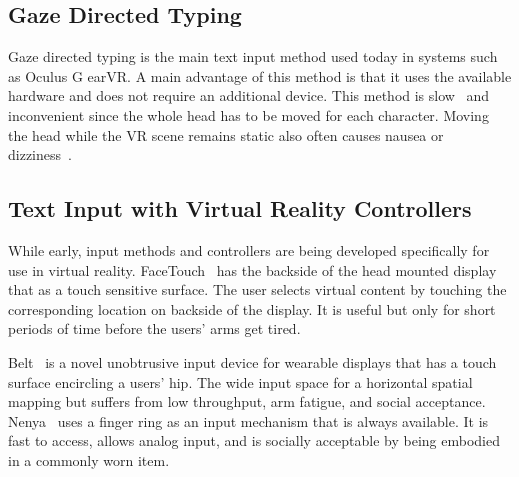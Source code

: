 \subsection{Gaze Directed Typing}
Gaze directed typing is the main text input method used today in systems such as Oculus G earVR. A main advantage of this method is that it uses the available hardware and does not require an additional device. This method is slow~\cite{card1983psychology, mackenzie1992fitts} and inconvenient since the whole head has to be moved for each character.
Moving the head while the VR scene remains static also often causes nausea or dizziness~\cite{atienza2016interaction}.   

\subsection{Text Input with Virtual Reality Controllers}
While early, input methods and controllers are being developed specifically for use in virtual reality.
FaceTouch~\cite{Gugenheimer:2016:FTI:2851581.2890242} has the backside of the head mounted display that as a touch sensitive surface.
The user selects virtual content by touching the corresponding location on backside of the display.
It is useful but only for short periods of time before the users' arms get tired.

Belt~\cite{dobbelstein2015belt} is a novel unobtrusive input device for wearable displays that has a touch surface encircling a users' hip.
The wide input space for a horizontal spatial mapping but suffers from low throughput, arm fatigue, and social acceptance.
Nenya~\cite{ashbrook2011nenya} uses a finger ring as an input mechanism that is always available.
It is fast to access, allows analog input, and is socially acceptable by being embodied in a commonly worn item.


\newcommand{\ra}[1]{\renewcommand{\arraystretch}{#1}}



